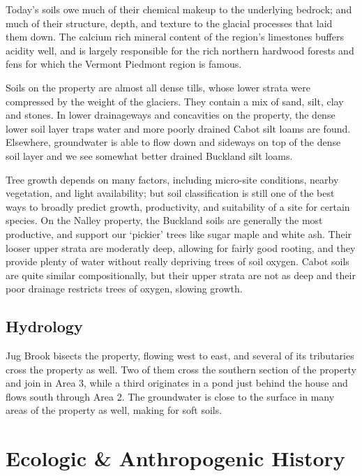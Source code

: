 \documentclass[]{tufte-handout}
\begin{document}
Today's soils owe much of their chemical makeup to the underlying
bedrock; and much of their structure, depth, and texture to the glacial
processes that laid them down. The calcium rich mineral content of the
region's limestones buffers acidity well, and is largely responsible for
the rich northern hardwood forests and fens for which the Vermont
Piedmont region is famous.

Soils on the property are almost all dense tills, whose lower strata
were compressed by the weight of the glaciers. They contain a mix of
sand, silt, clay and stones. In lower drainageways and concavities on
the property, the dense lower soil layer traps water and more poorly
drained Cabot silt loams are found. Elsewhere, groundwater is able to
flow down and sideways on top of the dense soil layer and we see
somewhat better drained Buckland silt loams.

Tree growth depends on many factors, including micro-site conditions,
nearby vegetation, and light availability; but soil classification is
still one of the best ways to broadly predict growth, productivity, and
suitability of a site for certain species. On the Nalley property, the
Buckland soils are generally the most productive, and support our
`pickier' trees like sugar maple and white ash. Their looser upper
strata are moderatly deep, allowing for fairly good rooting, and they
provide plenty of water without really depriving trees of soil oxygen.
Cabot soils are quite similar compositionally, but their upper strata
are not as deep and their poor drainage restricts trees of oxygen,
slowing growth.

\subsection{Hydrology}\label{hydrology}

Jug Brook bisects the property, flowing west to east, and several of its
tributaries cross the property as well. Two of them cross the southern
section of the property and join in Area 3, while a third originates in
a pond just behind the house and flows south through Area 2. The
groundwater is close to the surface in many areas of the property as
well, making for soft soils.

\section{Ecologic \& Anthropogenic
History}\label{ecologic-anthropogenic-history}
\end{document}
